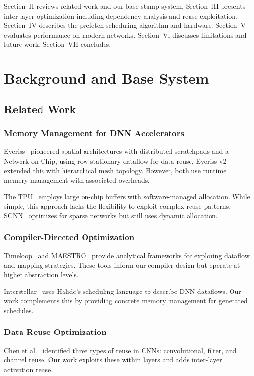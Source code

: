 \documentclass[journal]{IEEEtran}
\begin{document}
Section~II reviews related work and our base stamp system. Section~III presents inter-layer optimization including dependency analysis and reuse exploitation. Section~IV describes the prefetch scheduling algorithm and hardware. Section~V evaluates performance on modern networks. Section~VI discusses limitations and future work. Section~VII concludes.

\section{Background and Base System}

\subsection{Related Work}

\subsubsection{Memory Management for DNN Accelerators}
Eyeriss~\cite{chen2016eyeriss} pioneered spatial architectures with distributed scratchpads and a Network-on-Chip, using row-stationary dataflow for data reuse. Eyeriss v2~\cite{chen2019eyerissv2} extended this with hierarchical mesh topology. However, both use runtime memory management with associated overheads.

The TPU~\cite{jouppi2017tpu} employs large on-chip buffers with software-managed allocation. While simple, this approach lacks the flexibility to exploit complex reuse patterns. SCNN~\cite{parashar2017scnn} optimizes for sparse networks but still uses dynamic allocation.

\subsubsection{Compiler-Directed Optimization}
Timeloop~\cite{parashar2019timeloop} and MAESTRO~\cite{kwon2019understanding} provide analytical frameworks for exploring dataflow and mapping strategies. These tools inform our compiler design but operate at higher abstraction levels.

Interstellar~\cite{yang2020interstellar} uses Halide's scheduling language to describe DNN dataflows. Our work complements this by providing concrete memory management for generated schedules.

\subsubsection{Data Reuse Optimization}
Chen et al.~\cite{chen2016eyeriss} identified three types of reuse in CNNs: convolutional, filter, and channel reuse. Our work exploits these within layers and adds inter-layer activation reuse.
\end{document}

